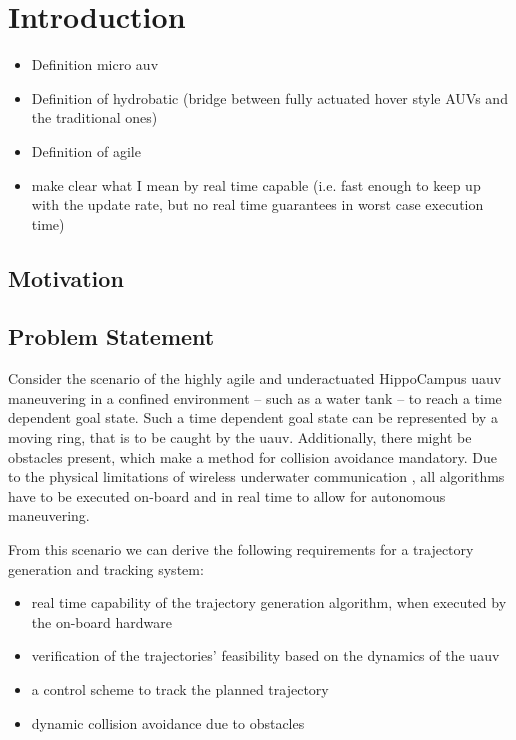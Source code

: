 \chapter{Introduction}
\begin{itemize}
    \color{red}
    \item Definition micro auv \cite{micro-auv}
    \item Definition of hydrobatic \cite{hydrobatic} (bridge between fully actuated hover style AUVs and the traditional ones)
    \item Definition of agile \cite{duecker-phd}
    \item make clear what I mean by real time capable (i.e. fast enough to keep up with the update rate, but no real time guarantees in worst case execution time)
\end{itemize}
\section{Motivation}
\section{Problem Statement}
Consider the scenario of the highly agile and underactuated HippoCampus \ac{uauv} maneuvering in a confined environment -- such as a water tank -- to reach a time dependent goal state.
Such a time dependent goal state can be represented by a moving ring, that is to be caught by the \ac{uauv}.
Additionally, there might be obstacles present, which make a method for collision avoidance mandatory.
Due to the physical limitations of wireless underwater communication \cite{Bettale08p1,GeistEtAl16}, all algorithms have to be executed on-board and in real time to allow for autonomous maneuvering.

From this scenario we can derive the following requirements for a trajectory generation and tracking system:

\begin{itemize}
    \item real time capability of the trajectory generation algorithm, when executed by the on-board hardware
    \item verification of the trajectories' feasibility based on the dynamics of the \ac{uauv}
    \item a control scheme to track the planned trajectory
    \item dynamic collision avoidance due to obstacles
\end{itemize}

